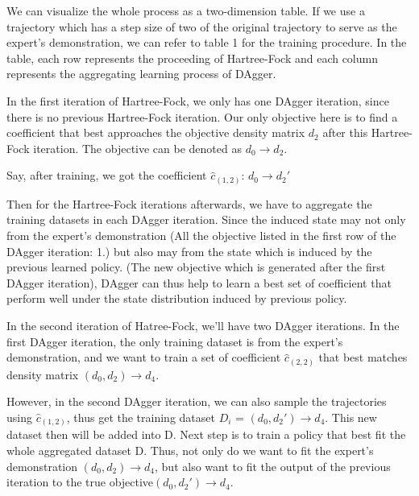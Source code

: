 \documentclass[twoside]{article}
\begin{document}
We can visualize the whole process as a two-dimension table. 
If we use a trajectory which has a step size of two of the original trajectory to serve as the expert's demonstration, we can refer to table 1 for the training procedure.
In the table, each row represents the proceeding of Hartree-Fock and each column represents the aggregating learning process of DAgger.

In the first iteration of Hartree-Fock, we only has one DAgger iteration, since there is no previous Hartree-Fock iteration. Our only objective here is to find a coefficient that best approaches the objective density matrix $d_2$ after this Hartree-Fock iteration. The objective can be denoted as $d_0 \rightarrow d_2$. 

Say, after training, we got the coefficient $\hat{c}_{(1,2)}$: $d_0 \rightarrow d_{2}'$ 

Then for the Hartree-Fock iterations afterwards, we have to aggregate the training datasets in each DAgger iteration. Since the induced state may not only from the expert's demonstration (All the objective listed in the first row of the DAgger iteration: 1.) but also
 may from the state which is induced by the previous learned policy. (The new objective which is generated after the first DAgger iteration), DAgger can thus help to learn a best set of coefficient that perform well under the state distribution induced by previous policy.

In the second iteration of Hatree-Fock, we'll have two DAgger iterations. In the first DAgger iteration, the only training dataset is from the expert's demonstration, and we want to train a set of coefficient  $\hat{c}_{(2,2)}$ that best matches density matrix $(d_0,d_2) \rightarrow d_4$.

However, in the second DAgger iteration, we can also sample the trajectories using $\hat{c}_{(1,2)}$, thus get the training dataset $D_i$ = $(d_0, d_2') \rightarrow d_4$. This new dataset then will be added into D.
Next step is to train a policy that best fit the whole aggregated dataset D. Thus, not only do we want to fit the expert's demonstration $(d_0, d_2) \rightarrow d_4$, but also want to fit the output of the previous iteration to the true objective$(d_0,d_{2}') \rightarrow d_4$. 
\end{document}
